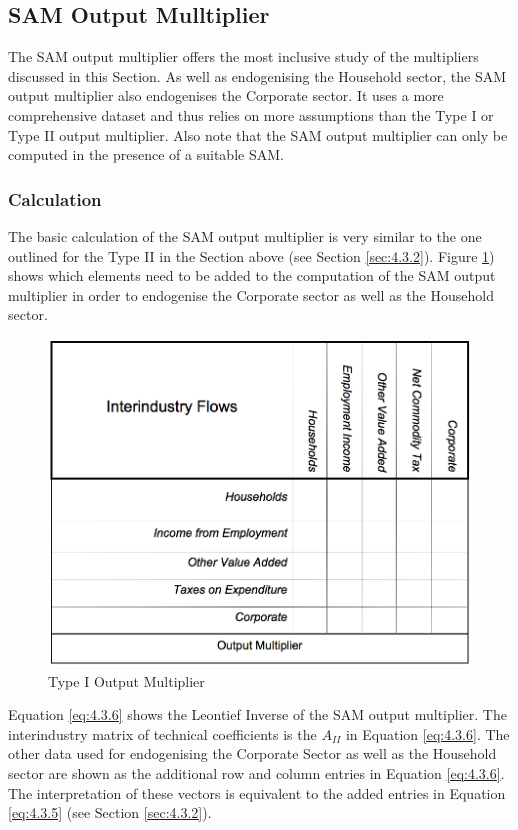 \begin{doublespacing}
\subsection{SAM Output Mulltiplier}
\label{sec:4.3.3}

The SAM output multiplier offers the most inclusive study of the multipliers discussed in this Section. As well as endogenising the Household sector, the SAM output multiplier also endogenises the Corporate sector. It uses a more comprehensive dataset and thus relies on more assumptions than the Type I or Type II output multiplier. Also note that the SAM output multiplier can only be computed in the presence of a suitable SAM.

\subsubsection{Calculation}

The basic calculation of the SAM output multiplier is very similar to the one outlined for the Type II in the Section above (see Section \ref{sec:4.3.2}). Figure \ref{fig:4.3.3}) shows which elements need to be added to the computation of the SAM output multiplier in order to endogenise the Corporate sector as well as the Household sector.

\bigskip
\begin{figure}[hb]
\label{fig:4.3.3}
  \centering
  \includegraphics[width=4.5in]{SAMOutputMultiplier}
  \caption{Type I Output Multiplier}
\end{figure}
\bigskip

Equation \ref{eq:4.3.6} shows the Leontief Inverse of the SAM output multiplier. The interindustry matrix of technical coefficients is the $A_{II}$ in Equation \ref{eq:4.3.6}. The other data used for endogenising the Corporate Sector as well as the Household sector are shown as the additional row and column entries in Equation \ref{eq:4.3.6}. The interpretation of these vectors is equivalent to the added entries in Equation \ref{eq:4.3.5} (see Section \ref{sec:4.3.2}).


\end{doublespacing}
